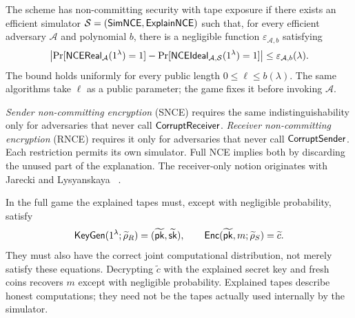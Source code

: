 \begin{definition}
\label{def:nce}
The scheme has non-committing security with tape exposure if there exists
an efficient simulator $\mathcal S=(\mathsf{SimNCE},\mathsf{ExplainNCE})$ such that,
for every efficient adversary $\mathcal A$ and polynomial $b$, there is a
negligible function $\varepsilon_{\mathcal A,b}$ satisfying
\[
  \left|
    \Pr[\mathsf{NCEReal}_{\mathcal A}(1^\lambda)=1]
    -\Pr[\mathsf{NCEIdeal}_{\mathcal A,\mathcal S}(1^\lambda)=1]
  \right|\leq\varepsilon_{\mathcal A,b}(\lambda).
\]
The bound holds uniformly for every public length
$0\leq\ell\leq b(\lambda)$.  The same algorithms take $\ell$ as a public
parameter; the game fixes it before invoking $\mathcal A$.
\end{definition}

\begin{definition}
\label{def:sender-nce}
\label{def:receiver-nce}
\emph{Sender non-committing encryption} (SNCE) requires the same
indistinguishability only for adversaries that never call
$\mathsf{CorruptReceiver}$.  \emph{Receiver non-committing encryption} (RNCE)
requires it only for adversaries that never call $\mathsf{CorruptSender}$.
Each restriction permits its own simulator.  Full NCE implies both by
discarding the unused part of the explanation.  The receiver-only
notion originates with Jarecki and Lysyanskaya~
\cite{JareckiLysyanskaya2000AdaptiveThreshold}.
\end{definition}

In the full game the explained tapes must, except with negligible
probability, satisfy
\[
  \mathsf{KeyGen}(1^\lambda;\widetilde\rho_R)
    =(\widetilde{\mathsf{pk}},\widetilde{\mathsf{sk}}),\qquad
  \mathsf{Enc}(\widetilde{\mathsf{pk}},m;\widetilde\rho_S)=\widetilde c.
\]
They must also have the correct joint computational distribution, not
merely satisfy these equations.  Decrypting $\widetilde c$ with the
explained secret key and fresh coins recovers $m$ except with negligible
probability.  Explained tapes describe honest computations; they need
not be the tapes actually used internally by the simulator.

